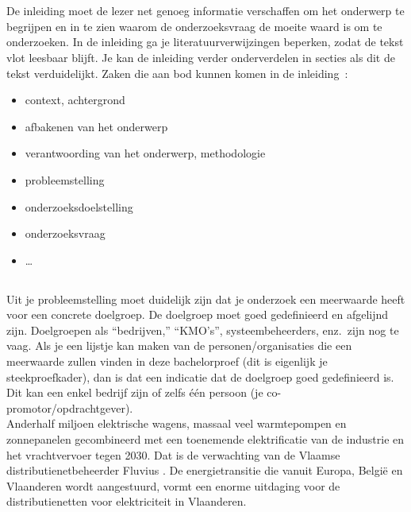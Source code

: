 
\chapter{}%
\label{ch:inleiding}

De inleiding moet de lezer net genoeg informatie verschaffen om het onderwerp te begrijpen en in te zien waarom de onderzoeksvraag de moeite waard is om te onderzoeken. In de inleiding ga je literatuurverwijzingen beperken, zodat de tekst vlot leesbaar blijft. Je kan de inleiding verder onderverdelen in secties als dit de tekst verduidelijkt. Zaken die aan bod kunnen komen in de inleiding~\autocite{Pollefliet2011}:

\begin{itemize}
  \item context, achtergrond
  \item afbakenen van het onderwerp
  \item verantwoording van het onderwerp, methodologie
  \item probleemstelling
  \item onderzoeksdoelstelling
  \item onderzoeksvraag
  \item \ldots
\end{itemize}

\section{}%
\label{sec:probleemstelling}

Uit je probleemstelling moet duidelijk zijn dat je onderzoek een meerwaarde heeft voor een concrete doelgroep. De doelgroep moet goed gedefinieerd en afgelijnd zijn. Doelgroepen als ``bedrijven,'' ``KMO's'', systeembeheerders, enz.~zijn nog te vaag. Als je een lijstje kan maken van de personen/organisaties die een meerwaarde zullen vinden in deze bachelorproef (dit is eigenlijk je steekproefkader), dan is dat een indicatie dat de doelgroep goed gedefinieerd is. Dit kan een enkel bedrijf zijn of zelfs één persoon (je co-promotor/opdrachtgever). \\

Anderhalf miljoen elektrische wagens, massaal veel warmtepompen en zonnepanelen gecombineerd met een toenemende elektrificatie van de industrie en het vrachtvervoer tegen 2030. Dat is de verwachting van de Vlaamse distributienetbeheerder Fluvius \autocite{Verdoodt2022}. De energietransitie die vanuit Europa, België en Vlaanderen wordt aangestuurd, vormt een enorme uitdaging voor de distributienetten voor elektriciteit in Vlaanderen.

